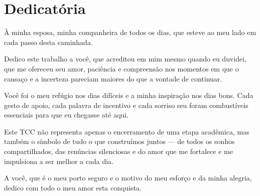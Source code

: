 \chapter*{Dedicatória}
À minha esposa,
minha companheira de todos os dias, que esteve ao meu lado em cada passo desta caminhada.

Dedico este trabalho a você, que acreditou em mim mesmo quando eu duvidei, que me ofereceu seu amor, paciência e compreensão nos momentos em que o cansaço e a incerteza pareciam maiores do que a vontade de continuar.

Você foi o meu refúgio nos dias difíceis e a minha inspiração nos dias bons. Cada gesto de apoio, cada palavra de incentivo e cada sorriso seu foram combustíveis essenciais para que eu chegasse até aqui.

Este TCC não representa apenas o encerramento de uma etapa acadêmica, mas também o símbolo de tudo o que construímos juntos — de todos os sonhos compartilhados, das renúncias silenciosas e do amor que me fortalece e me impulsiona a ser melhor a cada dia.

A você, que é o meu porto seguro e o motivo do meu esforço e da minha alegria, dedico com todo o meu amor esta conquista.
\pagebreak